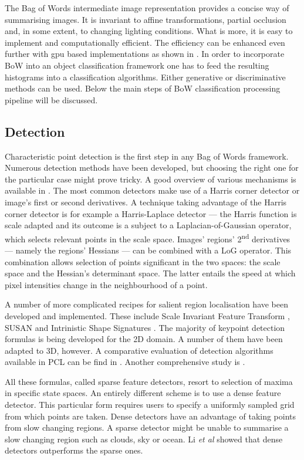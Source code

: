 	The Bag of Words intermediate image representation provides a concise way of summarising images. It is invariant to affine transformations, partial occlusion and, in some extent, to changing lighting conditions. What is more, it is easy to implement and computationally efficient. The efficiency can be enhanced even further with gpu based implementations as shown in \cite{van2011empowering}. In order to incorporate BoW into an object classification framework one has to feed the resulting histograms into a classification algorithms. Either generative or discriminative methods can be used. Below the main steps of BoW classification processing pipeline will be discussed.

\subsection{Detection}

	Characteristic point detection is the first step in any Bag of Words framework. Numerous detection methods have been developed, but choosing the right one for the particular case might prove tricky. A good overview of various mechanisms is available in \cite{tsai2012bag}. The most common detectors make use of a Harris corner detector or image's first or second derivatives. A technique taking advantage of the Harris corner detector is for example a Harris-Laplace detector --- the Harris function is scale adapted and its outcome is a subject to a Laplacian-of-Gaussian operator, which selects relevant points in the scale space. Images' regions' 2\textsuperscript{nd} derivatives --- namely the regions' Hessians --- can be combined with a LoG operator. This combination allows selection of points significant in the two spaces: the scale space and the Hessian's determinant space. The latter entails the speed at which pixel intensities change in the neighbourhood of a point.	
	
	A number of more complicated recipes for salient region localisation have been developed and implemented. These include Scale Invariant Feature Transform \cite{sift_keypoint}, SUSAN \cite{susan_keypoint} and Intrinistic Shape Signatures \cite{iss_keypoint}. The majority of keypoint detection formulas is being developed for the 2D domain. A number of them have been adapted to 3D, however. A comparative evaluation of detection algorithms available in PCL can be find in \cite{pcl_keypoint_comparision}. Another comprehensive study is \cite{3d_keypoint_eval}.
	
	All these formulas, called sparse feature detectors, resort to selection of maxima in specific state spaces. An entirely different scheme is to use a dense feature detector. This particular form requires users to specify a uniformly sampled grid from which points are taken. Dense detectors have an advantage of taking points from slow changing regions. A sparse detector might be unable to summarise a slow changing region such as clouds, sky or ocean. Li \emph{et al} showed that dense detectors outperforms the sparse ones.
	
